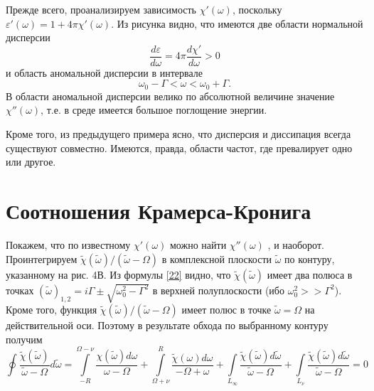 \documentclass[a4paper]{article}
\begin{document}
	Прежде всего, проанализируем зависимость $\chi'(\omega)$, поскольку \\$\varepsilon'(\omega)=1+4\pi\chi'(\omega)$. Из рисунка видно, что имеются две области нормальной дисперсии
	\begin{equation}
		\frac{d\varepsilon}{d\omega}=4\pi\frac{d\chi'}{d\omega}>0
	\end{equation}
	и область аномальной дисперсии в интервале  
	\begin{equation}
		\omega_{0}-\Gamma<\omega<\omega_{0}+\Gamma.
	\end{equation}
	В области аномальной дисперсии велико по абсолютной величине значение $\chi''(\omega)$, т.е. в среде имеется большое поглощение энергии.
	
	Кроме того, из предыдущего примера ясно, что дисперсия и диссипация всегда существуют совместно. Имеются, правда, области частот, где превалирует одно или другое.
	
	\section*{Соотношения Крамерса-Кронига}
	Покажем, что по известному  $\chi'(\omega)$  можно найти $\chi''(\omega)$  , и наоборот. Проинтегрируем $\tilde{\chi}(\tilde{\omega})/(\tilde{\omega}-\Omega)$  в комплексной плоскости $\tilde{\omega}$ по контуру, указанному на рис. 4В. Из  формулы \eqref{22}  видно, что  $\tilde{\chi}(\tilde{\omega})$ имеет два полюса в точках  $(\tilde{\omega})_{1,2}=i\Gamma\pm\sqrt{\omega_{0}^{2}-\Gamma^{2}}$  в верхней полуплоскости (ибо $\omega_{0}^{2}>>\Gamma^{2}$). Кроме того, функция  $\tilde{\chi}(\tilde{\omega})/(\tilde{\omega}-\Omega)$ имеет  полюс в точке $\tilde{\omega}=\Omega$ на  действительной оси. Поэтому в результате обхода по выбранному контуру получим 
	\begin{equation}
		\oint\frac{\tilde{\chi}(\tilde{\omega})}{\tilde{\omega}-\Omega}d\tilde{\omega}=\int\limits_{-R}^{\Omega-\nu}\frac{\chi(\tilde{\omega})d\omega}{\omega-\Omega}+\int\limits_{\Omega+\nu}^{R}\frac{\tilde{\chi}(\omega)d\omega}{-\Omega+\omega}+\int\limits_{L_{\infty}}\frac{\tilde{\chi}(\tilde{\omega})d\tilde{\omega}}{\tilde{\omega}-\Omega}+\int\limits_{L_{\nu}}\frac{\tilde{\chi}(\tilde{\omega})d\tilde{\omega}}{\tilde{\omega}-\Omega}=0
	\end{equation}
	
\end{document}
